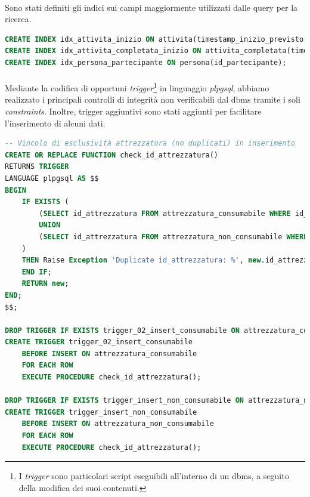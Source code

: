 \documentclass[11pt,a4paper,english]{article}
\begin{document}
\paragraph{} Sono stati definiti gli indici sui campi maggiormente utilizzati dalle query per la ricerca. 

\begin{lstlisting}[language=SQL, caption=Esempio di implementazione di indici]
CREATE INDEX idx_attivita_inizio ON attivita(timestamp_inizio_previsto, timestamp_fine_previsto);
CREATE INDEX idx_attivita_completata_inizio ON attivita_completata(timestamp_inizio_effettivo, timestamp_fine_effettivo); -- Per quantità stimata di attrezzaura consumabile
CREATE INDEX idx_persona_partecipante ON persona(id_partecipante);
\end{lstlisting}

\paragraph{} Mediante la codifica di opportuni \emph{trigger}\footnote{I \emph{trigger} sono particolari script eseguibili all'interno di un dbms, a seguito della modifica dei suoi contenuti.} in linguaggio \emph{plpgsql}, abbiamo realizzato i principali controlli di integrità non verificabili dal dbms tramite i soli \emph{constraints}. Inoltre, trigger aggiuntivi sono stati aggiunti per facilitare l'inserimento di alcuni dati.

\begin{lstlisting}[language=SQL, caption=Esempio di implementazione di trigger]
-- Vincolo di esclusività attrezzatura (no duplicati) in inserimento
CREATE OR REPLACE FUNCTION check_id_attrezzatura()
RETURNS TRIGGER
LANGUAGE plpgsql AS $$
BEGIN
    IF EXISTS (
        (SELECT id_attrezzatura FROM attrezzatura_consumabile WHERE id_attrezzatura = new.id_attrezzatura)
        UNION
        (SELECT id_attrezzatura FROM attrezzatura_non_consumabile WHERE id_attrezzatura = new.id_attrezzatura)
    )
    THEN Raise Exception 'Duplicate id_attrezzatura: %', new.id_attrezzatura;
    END IF;
    RETURN new;
END;
$$;

DROP TRIGGER IF EXISTS trigger_02_insert_consumabile ON attrezzatura_consumabile; -- Il '02' nel nome serve perché i trigger su una tabella sono controllati in ordine alfabetico
CREATE TRIGGER trigger_02_insert_consumabile
    BEFORE INSERT ON attrezzatura_consumabile
    FOR EACH ROW
    EXECUTE PROCEDURE check_id_attrezzatura();

DROP TRIGGER IF EXISTS trigger_insert_non_consumabile ON attrezzatura_non_consumabile;
CREATE TRIGGER trigger_insert_non_consumabile
    BEFORE INSERT ON attrezzatura_non_consumabile
    FOR EACH ROW
    EXECUTE PROCEDURE check_id_attrezzatura();
\end{lstlisting}
\end{document}
